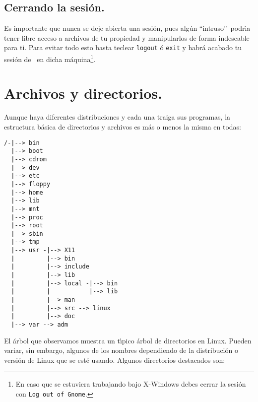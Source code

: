 \subsection{Cerrando la sesi{\'o}n.}

Es importante que nunca se deje abierta una sesi{\'o}n, pues alg{\'u}n
``intruso''\ podr{\'\i}a tener libre acceso a archivos de tu propiedad y
manipularlos de forma indeseable para ti. Para evitar todo esto basta
teclear \verb+logout+ {\'o} \verb+exit+ y habr{\'a} acabado tu sesi{\'o}n de
\unix\ en dicha m{\'a}quina\footnote{En caso que se estuviera trabajando
  bajo X-Windows debes cerrar la sesi{\'o}n con {\tt Log out of Gnome}.}.

\section{Archivos y directorios.}

Aunque haya diferentes distribuciones y cada una traiga sus programas,
la estructura b{\'a}sica de directorios y archivos es m{\'a}s o menos la
misma en todas:
\begin{verbatim}
/-|--> bin
  |--> boot
  |--> cdrom
  |--> dev
  |--> etc
  |--> floppy
  |--> home
  |--> lib
  |--> mnt
  |--> proc
  |--> root
  |--> sbin
  |--> tmp
  |--> usr -|--> X11
  |         |--> bin
  |         |--> include
  |         |--> lib
  |         |--> local -|--> bin
  |         |           |--> lib
  |         |--> man
  |         |--> src --> linux
  |         |--> doc
  |--> var --> adm
\end{verbatim}


El {\'a}rbol que observamos muestra un t{\'\i}pico {\'a}rbol de directorios en
Linux. Pueden variar, sin embargo, algunos de los nombres dependiendo
de la distribuci{\'o}n o versi{\'o}n de Linux que se est{\'e} usando. Algunos
directorios destacados son:

